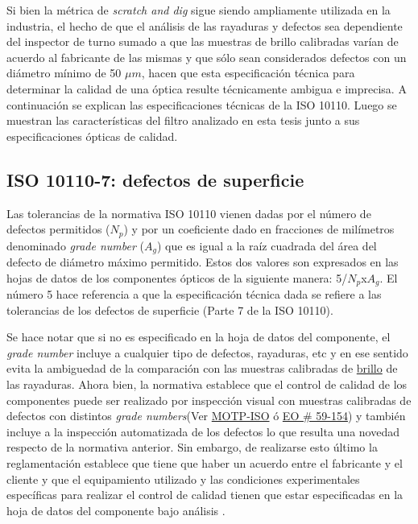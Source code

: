 Si bien la métrica de \textit{scratch and dig} sigue siendo ampliamente utilizada en la industria, el hecho de que el análisis de las rayaduras y defectos sea dependiente del inspector de turno sumado a que las muestras de brillo calibradas varían de acuerdo al fabricante de las mismas y que sólo sean considerados defectos con un diámetro mínimo de 50 $\mu m$, hacen que esta especificación técnica para determinar la calidad de una óptica resulte técnicamente ambigua e imprecisa.  A continuación se explican las especificaciones técnicas de la ISO 10110. Luego se muestran las características del filtro analizado en esta tesis junto a sus especificaciones ópticas de calidad.

\singlespacing
\subsection{ISO 10110-7: defectos de superficie}
\label{sec:iso10110}


\hspace{0.5cm}Las tolerancias de la normativa ISO 10110 vienen dadas por el número de defectos permitidos ($N_{p}$) y por un coeficiente dado en fracciones de milímetros denominado \textit{grade number} ($A_{g}$) que es igual a la raíz cuadrada del área del defecto de diámetro máximo permitido. Estos dos valores son expresados en las hojas de datos de los componentes ópticos de la siguiente manera: 5/$N_{p}$x$A_{g}$. El número 5 hace referencia a que la especificación técnica dada se refiere a las tolerancias de los defectos de superficie (Parte 7 de la ISO 10110). 

Se hace notar que si no es especificado en la hoja de datos del componente, el \textit{grade number} incluye a cualquier tipo de defectos, rayaduras, etc y en ese sentido evita la ambiguedad de la comparación con las muestras calibradas de \underline{brillo} de las rayaduras. Ahora bien, la normativa establece que el control de calidad de los componentes puede ser realizado por inspección visual con muestras calibradas de defectos con distintos \textit{grade numbers}(Ver \href{https://www.thorlabs.com/thorproduct.cfm?partnumber=MOTP-ISO}{MOTP-ISO} ó \href{https://www.edmundoptics.com/p/scratch-amp-dig-target-1st-surface-positive/15899/}{EO \# 59-154}) y también incluye a la inspección automatizada de los defectos lo que resulta una novedad respecto de la normativa anterior. Sin embargo, de realizarse esto último la reglamentación establece que tiene que haber un acuerdo entre el fabricante y el cliente y que el equipamiento utilizado y las condiciones experimentales específicas para realizar el control de calidad tienen que estar especificadas en la hoja de datos del componente bajo análisis \cite{acuerdocon}.

